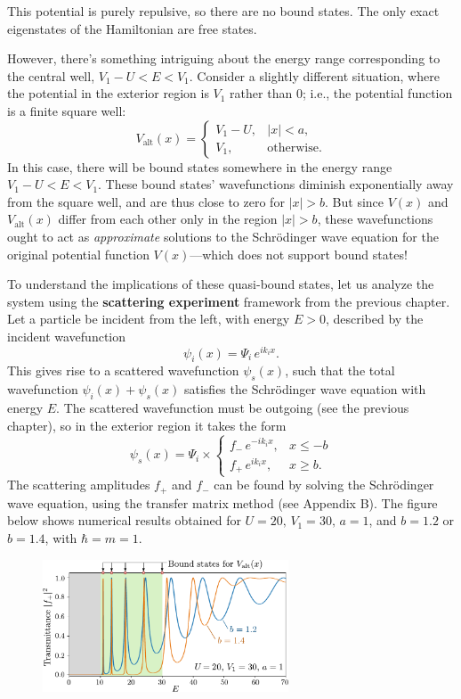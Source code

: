 \documentclass[pra,12pt]{revtex4}
\begin{document}
This potential is purely repulsive, so there are no bound states.  The
only exact eigenstates of the Hamiltonian are free states.

However, there's something intriguing about the energy range
corresponding to the central well, $V_1-U < E < V_1$.  Consider a
slightly different situation, where the potential in the exterior
region is $V_1$ rather than $0$; i.e., the potential function is a
finite square well:
$$V_{\mathrm{alt}}(x) = \begin{cases}V_1 - U, & |x| < a, \\ V_1, & \mathrm{otherwise}.\end{cases}$$
In this case, there will be bound states somewhere in the energy range
$V_1-U < E < V_1$.  These bound states' wavefunctions diminish
exponentially away from the square well, and are thus close to zero
for $|x| > b$.  But since $V(x)$ and $V_{\mathrm{alt}}(x)$ differ from
each other only in the region $|x| > b$, these wavefunctions ought to
act as \textit{approximate} solutions to the Schr\"odinger wave
equation for the original potential function $V(x)$---which does not
support bound states!

To understand the implications of these quasi-bound states, let us
analyze the system using the \textbf{scattering experiment} framework
from the previous chapter.  Let a particle be incident from the left,
with energy $E > 0$, described by the incident wavefunction
$$\psi_i(x) = \Psi_i \, e^{ik_i x}.$$
This gives rise to a scattered wavefunction $\psi_s(x)$, such that the
total wavefunction $\psi_i(x) + \psi_s(x)$ satisfies the Schr\"odinger
wave equation with energy $E$.  The scattered wavefunction must be
outgoing (see the previous chapter), so in the exterior region it
takes the form
$$\psi_s(x) = \Psi_i \times \begin{cases}f_- \,e^{-ik_ix}, & x \le -b \\ f_+ \,e^{ik_ix}, & x \ge b.\end{cases}$$
The scattering amplitudes $f_+$ and $f_-$ can be found by solving the
Schr\"odinger wave equation, using the transfer matrix method (see
Appendix B).  The figure below shows numerical results obtained for
$U = 20,\,V_1 = 30,\,a=1$, and $b = 1.2$ or $b = 1.4$, with $\hbar =
m = 1$.

\begin{figure}[h]
  \centering\includegraphics[width=0.65\textwidth]{resonances}
\end{figure}
\end{document}

